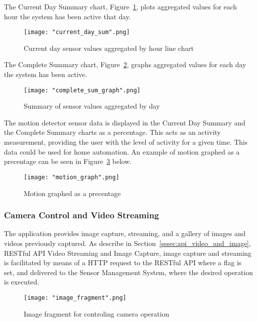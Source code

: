 \documentclass{article}
\begin{document}
\newpage
\noindent
The Current Day Summary chart, Figure~\ref{fig:android_current_day_chart},  plots aggregated values for each hour the system has been active that day. 
\begin{figure}[H]
\centering
\texttt{[image: "current\_day\_sum".png]}
\caption{Current day sensor values aggregated by hour line chart}
\label{fig:android_current_day_chart}
\end{figure}

\newpage
\noindent
The Complete Summary chart, Figure~\ref{fig:android_summary_day_chart},  graphs aggregated values for each day the system has been active.

\begin{figure}[H]
\centering
\texttt{[image: "complete\_sum\_graph".png]}
\caption{Summary of sensor values aggregated by day}
\label{fig:android_summary_day_chart}
\end{figure}

\newpage
\noindent
The motion detector sensor data is displayed in the Current Day Summary and the Complete Summary charts as a percentage. This acts as an activity measurement, providing the user with the level of activity for a given time. This data could be used for home automation. An example of motion graphed as a precentage can be seen in Figure~\ref{fig:android_summary_motion} below.

\begin{figure}[H]
\centering
\texttt{[image: "motion\_graph".png]}
\caption{Motion graphed as a precentage}
\label{fig:android_summary_motion}
\end{figure}

\newpage
\subsubsection{Camera Control and Video Streaming}
The application provides image capture, streaming, and a gallery of images and videos previously captured. As describe in Section~\ref{sssec:api_video_and_image}, RESTful API Video Streaming and Image Capture, image capture and streaming is facilitated by means of a HTTP request to the RESTful API where a flag is set, and delivered to the Sensor Management System, where the desired operation is executed.

\begin{figure}[H]
\centering
\texttt{[image: "image\_fragment".png]}
\caption{Image fragment for controling camera operation}
\label{fig:android_camera_fragment}
\end{figure}
\end{document}
